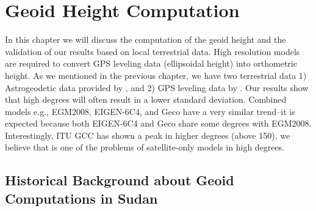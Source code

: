 \chapter{Geoid Height Computation}

In this chapter we will discuss the computation of the geoid height and the validation of our results based on local terrestrial data. High resolution models are required to convert GPS leveling data (ellipsoidal height) into orthometric height. As we mentioned in the previous chapter, we have two terrestrial data 1) Astrogeodetic data provided by \cite{osman}, and 2) GPS leveling data by \cite{ahmed_data}. Our results show that high degrees will often result in a lower standard deviation. Combined models e.g., EGM2008, EIGEN-6C4, and Geco have a very similar trend--it is expected because both EIGEN-6C4 and Geco share some degrees with EGM2008. Interestingly, ITU GCC has shown a peak in higher degrees (above 150), we believe that is one of the problems of satellite-only models in high degrees.

\section{Historical Background about Geoid Computations in Sudan}


